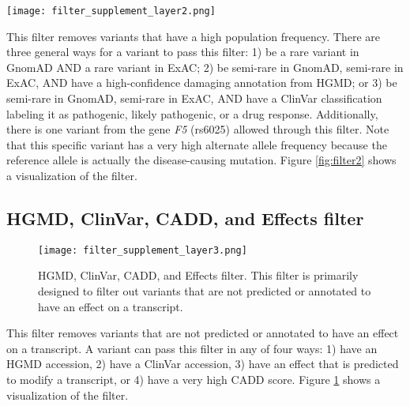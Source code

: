 \documentclass{article}
\begin{document}
\begin{sidewaysfigure}
\centering
\texttt{[image: filter\_supplement\_layer2.png]}
\caption{Population Allele Frequency filter.  This filter is primarily designed to filter out variants with a high population frequency.  It relies mostly on GnomAD and ExAC to determine allele frequencies.  Variants that are only semi-rare are allowed through if there are appropriate HGMD or ClinVar annotations supporting them.  Additionally, one variant in gene {\it F5} (rs6025) is allowed through because the reference allele is actually the rare, pathogenic allele.}
\label{fig:filter2}
\end{sidewaysfigure}

This filter removes variants that have a high population frequency.  There are three general ways for a variant to pass this filter: 1) be a rare variant in GnomAD AND a rare variant in ExAC; 2) be semi-rare in GnomAD, semi-rare in ExAC, AND have a high-confidence damaging annotation from HGMD; or 3) be semi-rare in GnomAD, semi-rare in ExAC, AND have a ClinVar classification labeling it as pathogenic, likely pathogenic, or a drug response.  Additionally, there is one variant from the gene {\it F5} (rs6025) allowed through this filter.  Note that this specific variant has a very high alternate allele frequency because the reference allele is actually the disease-causing mutation.  Figure \ref{fig:filter2} shows a visualization of the filter.

\subsection{HGMD, ClinVar, CADD, and Effects filter}

\begin{figure}
\centering
\texttt{[image: filter\_supplement\_layer3.png]}
\caption{HGMD, ClinVar, CADD, and Effects filter.  This filter is primarily designed to filter out variants that are not predicted or annotated to have an effect on a transcript.}
\label{fig:filter3}
\end{figure}

This filter removes variants that are not predicted or annotated to have an effect on a transcript.  A variant can pass this filter in any of four ways: 1) have an HGMD accession, 2) have a ClinVar accession, 3) have an effect that is predicted to modify a transcript, or 4) have a very high CADD score.  Figure \ref{fig:filter3} shows a visualization of the filter.
\end{document}
